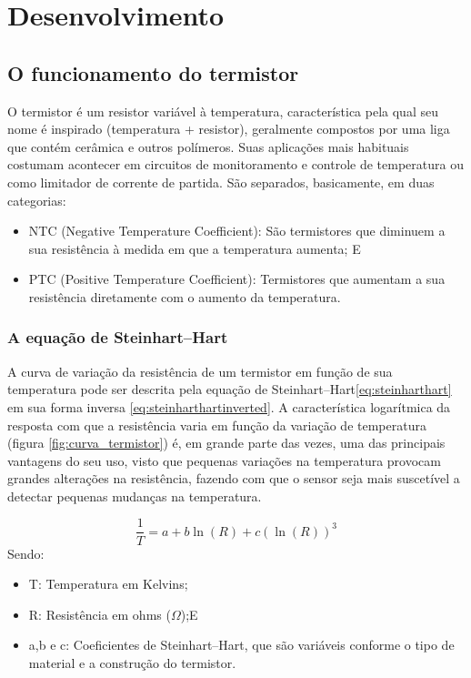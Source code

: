 \chapter{Desenvolvimento}
  
\section{O funcionamento do termistor}
 
	O termistor é um resistor variável à temperatura, característica pela qual seu nome é inspirado (temperatura + resistor), geralmente compostos por uma liga que contém cerâmica e outros polímeros. Suas aplicações mais habituais costumam acontecer em circuitos de monitoramento e controle de temperatura ou como limitador de corrente de partida. São separados, basicamente, em duas categorias:
	\begin{itemize}
		\item NTC (Negative Temperature Coefficient): São termistores que diminuem a sua resistência à medida em que a temperatura aumenta; E
		\item PTC (Positive Temperature Coefficient): Termistores que aumentam a sua resistência diretamente com o aumento da temperatura.
	\end{itemize}
	
	\subsection{A equação de Steinhart–Hart}
	
		A curva de variação da resistência de um termistor em função de sua temperatura pode ser descrita pela equação de Steinhart–Hart\ref{eq:steinharthart} em sua forma inversa \ref{eq:steinharthartinverted}. A característica logarítmica da resposta com que a resistência varia em função da variação de temperatura (figura \ref{fig:curva_termistor}) é, em grande parte das vezes, uma das principais vantagens do seu uso, visto que pequenas variações na temperatura provocam grandes alterações na resistência, fazendo com que o sensor seja mais suscetível a detectar pequenas mudanças na temperatura.
		
		
		\begin{equation}\label{eq:steinharthart}
		\dfrac{1}{T} = a + b\ln{(R)} + c(\ln{(R)})^3
		\end{equation}
		Sendo:
		\begin{itemize}
			\item T: Temperatura em Kelvins;
			\item R: Resistência em ohms ($\Omega$);E
			\item a,b e c: Coeficientes de Steinhart–Hart, que são variáveis conforme o tipo de material e a construção do termistor.		
		\end{itemize}
		
